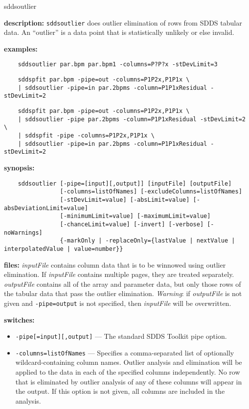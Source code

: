 \begin{sddsprog}{sddsoutlier}
  \item \textbf{description:} \verb|sddsoutlier| does outlier elimination of rows from SDDS tabular data. An ``outlier'' is a data point that is statistically unlikely or else invalid.
  \item \textbf{examples:}
    \begin{verbatim}
    sddsoutlier par.bpm par.bpm1 -columns=P?P?x -stDevLimit=3
    \end{verbatim}
    \begin{verbatim}
    sddspfit par.bpm -pipe=out -columns=P1P2x,P1P1x \
    | sddsoutlier -pipe=in par.2bpms -column=P1P1xResidual -stDevLimit=2
    \end{verbatim}
    \begin{verbatim}
    sddspfit par.bpm -pipe=out -columns=P1P2x,P1P1x \
    | sddsoutlier -pipe par.2bpms -column=P1P1xResidual -stDevLimit=2 \
    | sddspfit -pipe -columns=P1P2x,P1P1x \
    | sddsoutlier -pipe=in par.2bpms -column=P1P1xResidual -stDevLimit=2
    \end{verbatim}
  \item \textbf{synopsis:}
    \begin{verbatim}
    sddsoutlier [-pipe=[input][,output]] [inputFile] [outputFile]
                [-columns=listOfNames] [-excludeColumns=listOfNames]
                [-stDevLimit=value] [-absLimit=value] [-absDeviationLimit=value]
                [-minimumLimit=value] [-maximumLimit=value]
                [-chanceLimit=value] [-invert] [-verbose] [-noWarnings]
                {-markOnly | -replaceOnly={lastValue | nextValue | interpolatedValue | value=number}}
    \end{verbatim}
  \item \textbf{files:} \emph{inputFile} contains column data that is to be winnowed using outlier elimination. If \emph{inputFile} contains multiple pages, they are treated separately. \emph{outputFile} contains all of the array and parameter data, but only those rows of the tabular data that pass the outlier elimination. \emph{Warning}: if \emph{outputFile} is not given and \verb|-pipe=output| is not specified, then \emph{inputFile} will be overwritten.
  \item \textbf{switches:}
    \begin{itemize}
      \item \verb|-pipe[=input][,output]| --- The standard SDDS Toolkit pipe option.
      \item \verb|-columns=listOfNames| --- Specifies a comma-separated list of optionally wildcard-containing column names. Outlier analysis and elimination will be applied to the data in each of the specified columns independently. No row that is eliminated by outlier analysis of any of these columns will appear in the output. If this option is not given, all columns are included in the analysis.

\end{itemize}
\end{sddsprog}
